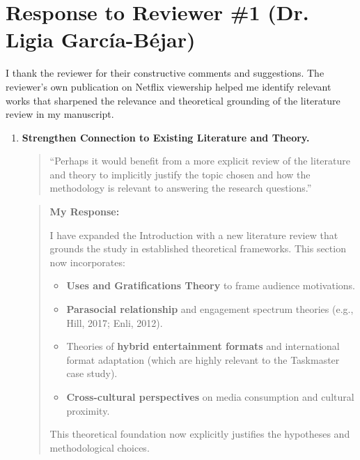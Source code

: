 \documentclass[11pt]{article}
\newenvironment{comment}{%
  \begin{quote}\em\noindent\ignorespaces%
}{%
  \end{quote}%
}
\newenvironment{response}{%
  \begin{quote}\noindent\textbf{My Response:}\par\medskip\noindent\ignorespaces%
}{%
  \end{quote}%
}
\begin{document}
\section*{Response to Reviewer \#1 (Dr. Ligia García-Béjar)}

I thank the reviewer for their constructive comments and suggestions. The reviewer's own publication on Netflix viewership helped me identify relevant works that sharpened the relevance and theoretical grounding of the literature review in my manuscript.

\begin{enumerate}[label=\textbf{Reviewer Comment \arabic*:}, wide, labelwidth=!, labelindent=0pt, leftmargin=*]

    \item \textbf{Strengthen Connection to Existing Literature and Theory.}
        \begin{comment}
        “Perhaps it would benefit from a more explicit review of the literature and theory to implicitly justify the topic chosen and how the methodology is relevant to answering the research questions.”
        \end{comment}
        \begin{response}
        I have expanded the Introduction with a new literature review that grounds the study in established theoretical frameworks. This section now incorporates:
        \begin{itemize}
            \item \textbf{Uses and Gratifications Theory} to frame audience motivations.
            \item \textbf{Parasocial relationship} and engagement spectrum theories (e.g., Hill, 2017; Enli, 2012).
            \item Theories of \textbf{hybrid entertainment formats} and international format adaptation (which are highly relevant to the Taskmaster case study).
            \item \textbf{Cross-cultural perspectives} on media consumption and cultural proximity.
        \end{itemize}
        This theoretical foundation now explicitly justifies the hypotheses and methodological choices.
        \end{response}


\end{enumerate}
\end{document}
